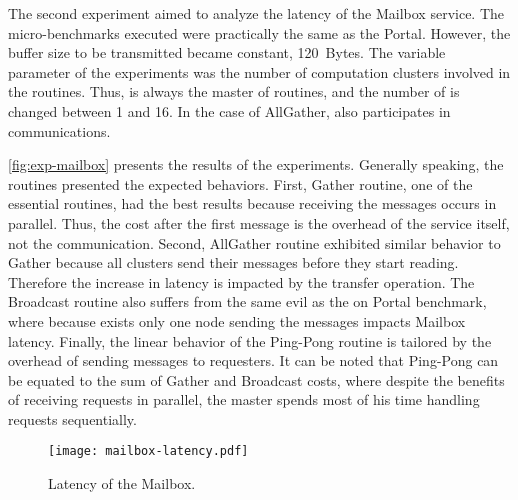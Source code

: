 		The second experiment aimed to analyze the latency of the Mailbox
		service. The micro-benchmarks executed were practically the same
		as the Portal. However, the buffer size to be transmitted became
		constant, 120~Bytes. The variable parameter of the experiments was
		the number of computation clusters involved in the routines.
		Thus, \iocluster is always the master of routines, and the number
		of \ccluster is changed between 1 and 16. In the case of AllGather,
		\iocluster also participates in communications.

		\autoref{fig:exp-mailbox} presents the results of the experiments.
		Generally speaking, the routines presented the expected behaviors.
		First, Gather routine, one of the essential routines, had the best
		results because receiving the messages occurs in parallel. Thus,
		the cost after the first message is the overhead of the service
		itself, not the communication. Second, AllGather routine exhibited
		similar behavior to Gather because all clusters send their messages
		before they start reading. Therefore the increase in latency is
		impacted by the transfer operation. The Broadcast routine also
		suffers from the same evil as the on Portal benchmark, where because
		exists only one node sending the messages impacts Mailbox latency.
		Finally, the linear behavior of the Ping-Pong routine is tailored
		by the overhead of sending messages to requesters. It can be noted
		that Ping-Pong can be equated to the sum of Gather and Broadcast
		costs, where despite the benefits of receiving requests in parallel,
		the master spends most of his time handling requests sequentially.

		\begin{figure}[!tb]
			\centering%
			\caption{Latency of the Mailbox.}%
			\label{fig:exp-mailbox}%
			\texttt{[image: mailbox-latency.pdf]}%
		\end{figure}

